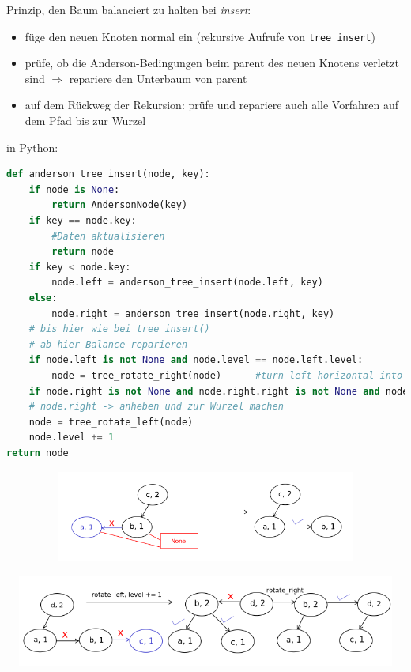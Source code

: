 \documentclass[11pt, fleqn]{scrreprt}
\begin{document}
Prinzip, den Baum balanciert zu halten bei \emph{insert}:
\begin{itemize}
	\item füge den neuen Knoten normal ein (rekursive Aufrufe von \verb|tree_insert|)
	\item prüfe, ob die Anderson-Bedingungen beim parent des neuen Knotens verletzt sind $\Rightarrow$ repariere den Unterbaum von parent
	\item auf dem Rückweg der Rekursion: prüfe und repariere auch alle Vorfahren auf dem Pfad bis zur Wurzel
\end{itemize}
in Python:
\begin{lstlisting}[language=Python]
def anderson_tree_insert(node, key):
	if node is None:
		return AndersonNode(key)
	if key == node.key:
		#Daten aktualisieren
		return node
	if key < node.key:
		node.left = anderson_tree_insert(node.left, key)
	else:
		node.right = anderson_tree_insert(node.right, key)
	# bis hier wie bei tree_insert()
	# ab hier Balance reparieren
	if node.left is not None and node.level == node.left.level:
		node = tree_rotate_right(node)		#turn left horizontal into right horizontal
	if node.right is not None and node.right.right is not None and node.level == node.right.right.level:	#zwei horizontal hintereinander
	# node.right -> anheben und zur Wurzel machen
	node = tree_rotate_left(node)
	node.level += 1
return node
\end{lstlisting}
\includegraphics[width=16cm,height=3cm,keepaspectratio]{./Pictures/AndersonPython1.png}

\includegraphics[width=16cm,height=3cm,keepaspectratio]{./Pictures/AndersonPython2.png}
\end{document}

